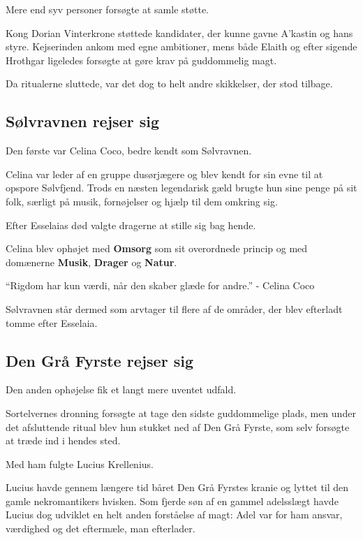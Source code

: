 \documentclass[a5paper,10pt,twoside,openany]{memoir}
\newenvironment{pullquote}
  {%
    \begin{tcolorbox}[
      enhanced,
      breakable
    ]
    \itshape
    \large
  }
  {%
    \end{tcolorbox}
  }
\begin{document}
Mere end syv personer forsøgte at samle støtte.

Kong Dorian Vinterkrone støttede kandidater, der kunne gavne A'kastin og hans styre. Kejserinden ankom med egne ambitioner, mens både Elaith og efter sigende Hrothgar ligeledes forsøgte at gøre krav på guddommelig magt.

Da ritualerne sluttede, var det dog to helt andre skikkelser, der stod tilbage.

\subsection*{Sølvravnen rejser sig}

Den første var Celina Coco, bedre kendt som Sølvravnen.

Celina var leder af en gruppe dusørjægere og blev kendt for sin evne til at opspore Sølvfjend. Trods en næsten legendarisk gæld brugte hun sine penge på sit folk, særligt på musik, fornøjelser og hjælp til dem omkring sig.

Efter Esselaias død valgte dragerne at stille sig bag hende.

Celina blev ophøjet med \textbf{Omsorg} som sit overordnede princip og med domænerne \textbf{Musik}, \textbf{Drager} og \textbf{Natur}.

\begin{pullquote}
``Rigdom har kun værdi, når den skaber glæde for andre.''
- Celina Coco
\end{pullquote}

Sølvravnen står dermed som arvtager til flere af de områder, der blev efterladt tomme efter Esselaia.

\subsection*{Den Grå Fyrste rejser sig}

Den anden ophøjelse fik et langt mere uventet udfald.

Sortelvernes dronning forsøgte at tage den sidste guddommelige plads, men under det afsluttende ritual blev hun stukket ned af Den Grå Fyrste, som selv forsøgte at træde ind i hendes sted.

Med ham fulgte Lucius Krellenius.

Lucius havde gennem længere tid båret Den Grå Fyrstes kranie og lyttet til den gamle nekromantikers hvisken. Som fjerde søn af en gammel adelsslægt havde Lucius dog udviklet en helt anden forståelse af magt: Adel var for ham ansvar, værdighed og det eftermæle, man efterlader.
\end{document}
